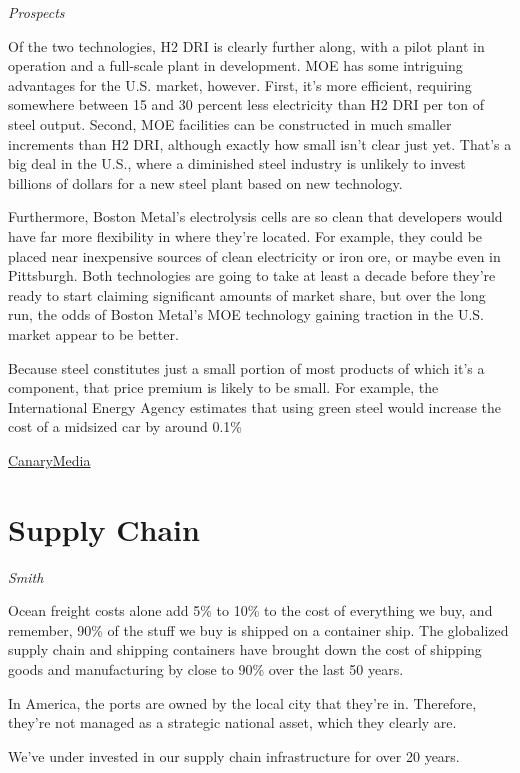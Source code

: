 \documentclass[
]{book}
\begin{document}
\emph{Prospects}

Of the two technologies, H2 DRI is clearly further along, with a pilot plant in operation and a full-scale plant in development. MOE has some intriguing advantages for the U.S. market, however. First, it's more efficient, requiring somewhere between 15 and 30 percent less electricity than H2 DRI per ton of steel output. Second, MOE facilities can be constructed in much smaller increments than H2 DRI, although exactly how small isn't clear just yet. That's a big deal in the U.S., where a diminished steel industry is unlikely to invest billions of dollars for a new steel plant based on new technology.

Furthermore, Boston Metal's electrolysis cells are so clean that developers would have far more flexibility in where they're located. For example, they could be placed near inexpensive sources of clean electricity or iron ore, or maybe even in Pittsburgh. Both technologies are going to take at least a decade before they're ready to start claiming significant amounts of market share, but over the long run, the odds of Boston Metal's MOE technology gaining traction in the U.S. market appear to be better.

Because steel constitutes just a small portion of most products of which it's a component, that price premium is likely to be small. For example, the International Energy Agency estimates that using green steel would increase the cost of a midsized car by around 0.1\%

\href{https://www.canarymedia.com/articles/joe-bidens-green-new-steel/}{CanaryMedia}

\hypertarget{supply-chain}{%
\chapter{Supply Chain}\label{supply-chain}}

\emph{Smith}

Ocean freight costs alone add 5\% to 10\% to the cost of everything we buy, and remember, 90\% of the stuff we buy is shipped on a container ship. The globalized supply chain and shipping containers have brought down the cost of shipping goods and manufacturing by close to 90\% over the last 50 years.

In America, the ports are owned by the local city that they're in. Therefore, they're not managed as a strategic national asset, which they clearly are.

We've under invested in our supply chain infrastructure for over 20 years.
\end{document}
